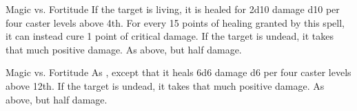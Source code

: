 \begin{spellheader}
    \spellrng{\rngclose}
\end{spellheader}
\begin{spelleffects}
    \begin{spellattack}{Magic vs. Fortitude}
        \spelleffect If the target is living, it is healed for 2d10 damage \add d10 per four caster levels above 4th. For every 15 points of healing granted by this spell, it can instead cure 1 point of critical damage.
        \spellsuccess If the target is undead, it takes that much positive damage.
        \spellfailure As above, but half damage.
    \end{spellattack}
\end{spelleffects}
\begin{spellfooter}

\end{spellfooter}

\begin{spellheader}
\end{spellheader}
\begin{spelleffects}
    \begin{spellattack}{Magic vs. Fortitude}
        \spelleffect As , except that it heals 6d6 damage \add d6 per four caster levels above 12th.
        \spellsuccess If the target is undead, it takes that much positive damage.
        \spellfailure As above, but half damage.
    \end{spellattack}
\end{spelleffects}
\begin{spellfooter}

\end{spellfooter}

